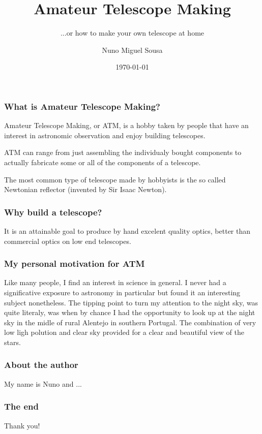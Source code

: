 \documentclass{beamer}
\title{Amateur Telescope Making}
\subtitle{...or how to make your own telescope at home}
\author{Nuno Miguel Sousa}
\institute{Coimbra, Portugal}
\date{\today}
\begin{document}
\begin{frame}
\titlepage
\end{frame}

\begin{frame}
\frametitle{What is Amateur Telescope Making?}
\begin{block}{}
Amateur Telescope Making, or ATM, is a hobby taken by people that have an interest in astronomic observation and enjoy building telescopes.\footnotemark
\end{block}
\begin{block}{}
ATM can range from just assembling the individualy bought components to actually fabricate some or all of the components of a telescope.
\end{block}
\begin{block}{}
The most common type of telescope made by hobbyists is the so called Newtonian reflector (invented by Sir Isaac Newton).\footnotemark
\end{block}
\end{frame}

\begin{frame}
\frametitle{Why build a telescope?}
\begin{block}
It is an attainable goal to produce by hand excelent quality optics, better than commercial optics on low end telescopes.\footnotemark
\end{block}
\end{frame}

\begin{frame}
\frametitle{My personal motivation for ATM}
Like many people, I find an interest in science in general. I never had a significative exposure to astronomy in particular but found it an interesting subject nonetheless.
The tipping point to turn my attention to the night sky, was quite literaly, was when by chance I had the opportunity to look up at the night sky in the midle of rural Alentejo in southern Portugal. The combination of very low ligh polution and clear sky provided for a clear and beautiful view of the stars.
\end{frame}

\begin{frame}
\frametitle{About the author}
My name is Nuno and ...
\end{frame}

\begin{frame}
\frametitle{The end}
Thank you!
\end{frame}
\end{document}

